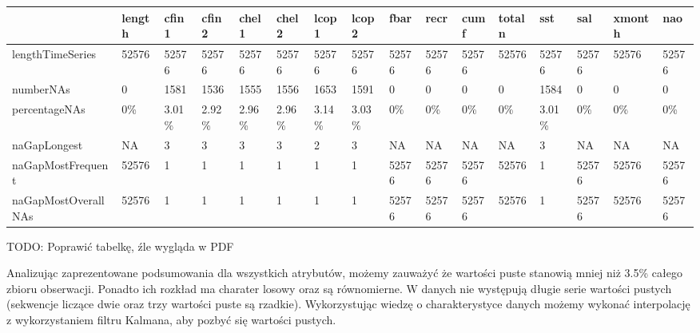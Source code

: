 \documentclass[]{article}
\newenvironment{Shaded}{\begin{snugshade}}{\end{snugshade}}
\newcommand{\KeywordTok}[1]{\textcolor[rgb]{0.13,0.29,0.53}{\textbf{#1}}}
\newcommand{\NormalTok}[1]{#1}
\newcommand{\OperatorTok}[1]{\textcolor[rgb]{0.81,0.36,0.00}{\textbf{#1}}}
\newcommand{\StringTok}[1]{\textcolor[rgb]{0.31,0.60,0.02}{#1}}
\begin{document}
\begin{longtable}[]{@{}llllllllllllllll@{}}
\toprule
& length & cfin1 & cfin2 & chel1 & chel2 & lcop1 & lcop2 & fbar & recr &
cumf & totaln & sst & sal & xmonth & nao\tabularnewline
\midrule
\endhead
lengthTimeSeries & 52576 & 52576 & 52576 & 52576 & 52576 & 52576 & 52576
& 52576 & 52576 & 52576 & 52576 & 52576 & 52576 & 52576 &
52576\tabularnewline
numberNAs & 0 & 1581 & 1536 & 1555 & 1556 & 1653 & 1591 & 0 & 0 & 0 & 0
& 1584 & 0 & 0 & 0\tabularnewline
percentageNAs & 0\% & 3.01\% & 2.92\% & 2.96\% & 2.96\% & 3.14\% &
3.03\% & 0\% & 0\% & 0\% & 0\% & 3.01\% & 0\% & 0\% & 0\%\tabularnewline
naGapLongest & NA & 3 & 3 & 3 & 3 & 2 & 3 & NA & NA & NA & NA & 3 & NA &
NA & NA\tabularnewline
naGapMostFrequent & 52576 & 1 & 1 & 1 & 1 & 1 & 1 & 52576 & 52576 &
52576 & 52576 & 1 & 52576 & 52576 & 52576\tabularnewline
naGapMostOverallNAs & 52576 & 1 & 1 & 1 & 1 & 1 & 1 & 52576 & 52576 &
52576 & 52576 & 1 & 52576 & 52576 & 52576\tabularnewline
\bottomrule
\end{longtable}

TODO: Poprawić tabelkę, źle wygląda w PDF

Analizując zaprezentowane podsumowania dla wszystkich atrybutów, możemy
zauważyć że wartości puste stanowią mniej niż 3.5\% całego zbioru
obserwacji. Ponadto ich rozkład ma charater losowy oraz są równomierne.
W danych nie występują długie serie wartości pustych (sekwencje liczące
dwie oraz trzy wartości puste są rzadkie). Wykorzystując wiedzę o
charakterystyce danych możemy wykonać interpolację z wykorzystaniem
filtru Kalmana, aby pozbyć się wartości pustych.

\begin{Shaded}
\end{Shaded}
\end{document}
